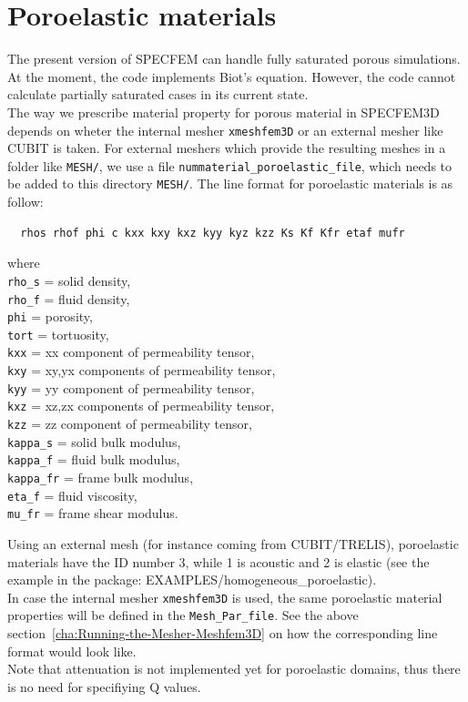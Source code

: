 \section{Poroelastic materials}\label{cha:Poroelastic-materials}

The present version of SPECFEM can handle fully saturated porous simulations.
At the moment, the code implements Biot's equation.
However, the code cannot calculate partially saturated cases in its current state.\\


The way we prescribe material property for porous material in SPECFEM3D depends on wheter the internal mesher \texttt{xmeshfem3D}
or an external mesher like CUBIT is taken.
For external meshers which provide the resulting meshes in a folder like \texttt{MESH/},
we use a file \texttt{nummaterial\_poroelastic\_file}, which needs to be added to this directory \texttt{MESH/}.
The line format for poroelastic materials is as follow:
{\small \begin{verbatim}
  rhos rhof phi c kxx kxy kxz kyy kyz kzz Ks Kf Kfr etaf mufr
\end{verbatim}}
\begin{description}
\item where\\
\texttt{rho\_s} = solid density,\\
\texttt{rho\_f} = fluid density,\\
\texttt{phi} = porosity,\\
\texttt{tort} = tortuosity,\\
\texttt{kxx} = xx component of permeability tensor,\\
\texttt{kxy} = xy,yx components of permeability tensor,\\
\texttt{kyy} = yy component of permeability tensor,\\
\texttt{kxz} = xz,zx components of permeability tensor,\\
\texttt{kzz} = zz component of permeability tensor,\\
\texttt{kappa\_s} = solid bulk modulus,\\
\texttt{kappa\_f} = fluid bulk modulus,\\
\texttt{kappa\_fr} = frame bulk modulus,\\
\texttt{eta\_f} = fluid viscosity,\\
\texttt{mu\_fr} = frame shear modulus.\\
\end{description}
Using an external mesh (for instance coming from CUBIT/TRELIS), poroelastic materials have the ID number 3, while 1 is acoustic and 2 is elastic (see the example in the package: EXAMPLES/homogeneous\_poroelastic).\\

\noindent
In case the internal mesher \texttt{xmeshfem3D} is used, the same poroelastic material properties will be defined in the \texttt{Mesh\_Par\_file}.
See the above section~\ref{cha:Running-the-Mesher-Meshfem3D} on how the corresponding line format would look like.\\

\noindent
Note that attenuation is not implemented yet for poroelastic domains, thus there is no need for specifiying Q values.
